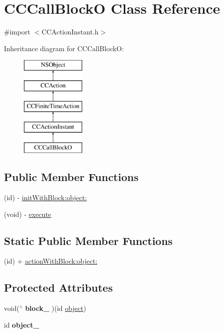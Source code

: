\hypertarget{interface_c_c_call_block_o}{\section{C\-C\-Call\-Block\-O Class Reference}
\label{interface_c_c_call_block_o}
}


{\ttfamily \#import $<$C\-C\-Action\-Instant.\-h$>$}

Inheritance diagram for C\-C\-Call\-Block\-O\-:\begin{figure}[H]
\begin{center}
\leavevmode
\includegraphics[height=5.000000cm]{interface_c_c_call_block_o}
\end{center}
\end{figure}
\subsection*{Public Member Functions}
\begin{DoxyCompactItemize}
\item 
(id) -\/ \hyperlink{interface_c_c_call_block_o_aa4871e247f66a7040f94efc39954869f}{init\-With\-Block\-:object\-:}
\item 
(void) -\/ \hyperlink{interface_c_c_call_block_o_ac6147e80c0bfeeeb9f46b19d7cb773ea}{execute}
\end{DoxyCompactItemize}
\subsection*{Static Public Member Functions}
\begin{DoxyCompactItemize}
\item 
(id) + \hyperlink{interface_c_c_call_block_o_a9fe2815b2ef40e663dc026185f990ff0}{action\-With\-Block\-:object\-:}
\end{DoxyCompactItemize}
\subsection*{Protected Attributes}
\begin{DoxyCompactItemize}
\item 
\hypertarget{interface_c_c_call_block_o_a27f67c38fc9cc618b32ec7ad6085baa1}{void($^\wedge$ {\bfseries block\-\_\-} )(id \hyperlink{interface_c_c_call_block_o_a4c593d3153aec9610ec97d388371ce07}{object})}\label{interface_c_c_call_block_o_a27f67c38fc9cc618b32ec7ad6085baa1}

\item 
\hypertarget{interface_c_c_call_block_o_ae20586a462a83eeadd16e7eba04494e2}{id {\bfseries object\-\_\-}}\label{interface_c_c_call_block_o_ae20586a462a83eeadd16e7eba04494e2}

\end{DoxyCompactItemize}
